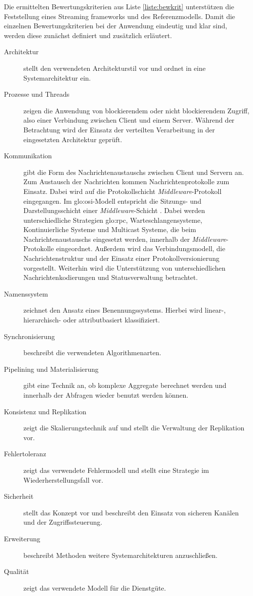 Die ermittelten Bewertungskriterien aus Liste \ref{liste:bewkrit} unterstützen die Feststellung eines Streaming frameworks und des Referenzmodells. Damit die einzelnen Bewertungskriterien bei der Anwendung eindeutig und klar sind, werden diese zunächst definiert und zusätzlich erläutert.

\begin{description}
	\item[Architektur] stellt den verwendeten Architekturstil vor und ordnet in eine Systemarchitektur ein.
	\item[Prozesse und Threads] zeigen die Anwendung von blockierendem oder nicht blockierendem Zugriff, also einer Verbindung zwischen Client und einem Server. Während der Betrachtung wird der Einsatz der verteilten Verarbeitung in der eingesetzten Architektur geprüft.
	\item[Kommunikation] gibt die Form des Nachrichtenaustauschs zwischen Client und Servern an. Zum Austausch der Nachrichten kommen Nachrichtenprotokolle zum Einsatz. Dabei wird auf die Protokollschicht \textit{Middleware}-Protokoll eingegangen. Im \acrshort{glo:osi}-Modell entspricht die Sitzungs- und Darstellungsschicht einer \textit{Middleware}-Schicht . Dabei werden unterschiedliche Strategien \gls{glo:rpc}, Warteschlangensysteme, Kontinuierliche Systeme und Multicast Systeme, die beim Nachrichtenaustauschs eingesetzt werden, innerhalb der \textit{Middleware}-Protokolle eingeordnet. Außerdem wird das Verbindungsmodell, die Nachrichtenstruktur und der Einsatz einer Protokollversionierung vorgestellt. Weiterhin wird die Unterstützung von unterschiedlichen Nachrichtenkodierungen und Statusverwaltung betrachtet.
	\item[Namenssystem] zeichnet den Ansatz eines Benennungssystems. Hierbei wird linear-, hierarchisch- oder attributbasiert klassifiziert.
	\item[Synchronisierung] beschreibt die verwendeten Algorithmenarten. 
	\item[Pipelining und Materialisierung] gibt eine Technik an, ob komplexe Aggregate berechnet werden und innerhalb der Abfragen wieder benutzt werden können.
	\item[Konsistenz und Replikation] zeigt die Skalierungstechnik auf und stellt die Verwaltung der Replikation vor. 	
	\item[Fehlertoleranz] zeigt das verwendete Fehlermodell und stellt eine Strategie im Wiederherstellungsfall vor.
	\item[Sicherheit] stellt das Konzept vor und beschreibt den Einsatz von sicheren Kanälen und der Zugriffssteuerung.	
	\item[Erweiterung] beschreibt Methoden weitere Systemarchitekturen anzuschließen.
	\item[Qualität] zeigt das verwendete Modell für die Dienstgüte.
\end{description}

